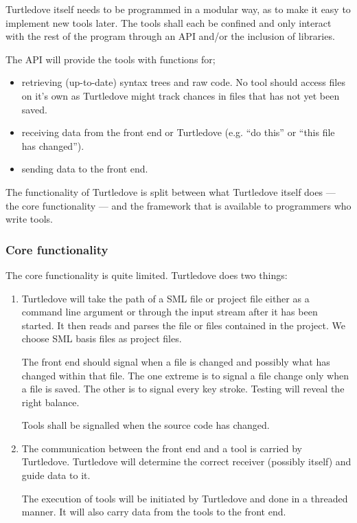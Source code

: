 \documentclass[a4paper,oneside]{article}
\begin{document}
Turtledove itself needs to be programmed in a modular way, as to make it easy to implement new tools
later. The tools shall each be confined and only interact with the rest of the program through an
API and/or the inclusion of libraries.

The API will provide the tools with functions for;
\begin{itemize}
\item retrieving (up-to-date) syntax trees and raw code. No tool should access files on it's own as
      Turtledove might track chances in files that has not yet been saved.
\item receiving data from the front end or Turtledove (e.g. ``do this'' or ``this file has changed'').
\item sending data to the front end.
\end{itemize}

The functionality of Turtledove is split between what Turtledove itself does --- the core
functionality --- and the framework that is available to programmers who write tools.
\subsubsection{Core functionality}
The core functionality is quite limited. Turtledove does two things:
\begin{enumerate}
\item Turtledove will take the path of a SML file or project file either as a command line argument
      or through the input stream after it has been started. It then reads and parses the file or
      files contained in the project. We choose SML basis files as project files.

      The front end should signal when a file is changed and possibly what has changed within that
      file. The one extreme is to signal a file change only when a file is saved. The other is to
      signal every key stroke. Testing will reveal the right balance.

      Tools shall be signalled when the source code has changed.

\item The communication between the front end and a tool is carried by Turtledove. Turtledove will
      determine the correct receiver (possibly itself) and guide data to it.

      The execution of tools will be initiated by Turtledove and done in a threaded manner. It will
      also carry data from the tools to the front end.
\end{enumerate}
\end{document}
